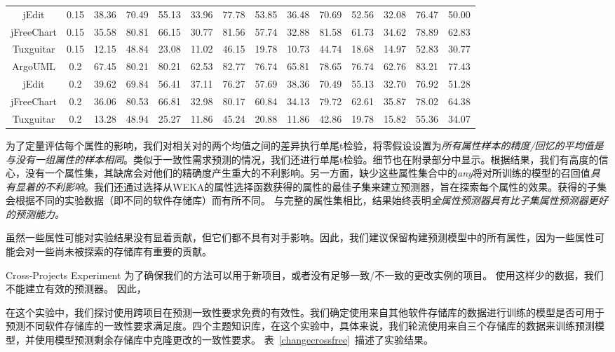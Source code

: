 {\begin{table}[htbp]
\begin{tabular}{cccccccccccccc}
jEdit&0.15&	38.36&	70.49&	55.13&	33.96&	77.78&	53.85&	36.48&	70.69&	52.56&	32.08&	76.47&	50.00\\
jFreeChart&0.15&	35.58&	80.81&	66.15&	30.77&	81.56&	57.74&	32.88&	81.58&	61.73&	34.62&	78.89&	62.83\\
Tuxguitar&0.15&	12.15&	48.84&	23.08&	11.02&	46.15&	19.78&	10.73&	44.74&	18.68&	14.97&	52.83&	30.77\\
\hline
ArgoUML&0.2&	67.45&	80.21&	80.21&	62.53&	82.77&	76.74&	65.81&	78.65&	76.74&	62.76&	83.21&	77.43\\
jEdit&0.2&	39.62&	69.84&	56.41&	37.11&	76.27&	57.69&	38.36&	70.49&	55.13&	32.70&	76.92&	51.28\\
jFreeChart&0.2&	36.06&	80.53&	66.81&	32.98&	80.17&	60.84&	34.13&	79.72&	62.61&	35.87&	78.02&	64.38\\
Tuxguitar&0.2&	13.28&	48.94&	25.27&	11.86&	45.24&	20.88&	11.86&	42.86&	19.78&	15.82&	55.36&	34.07\\
\bottomrule[1.5pt]
\end{tabular}
\end{table}

为了定量评估每个属性的影响，我们对相关对的两个均值之间的差异执行单尾t检验，将零假设设置为{\em 所有属性样本的精度/回忆的平均值是与没有一组属性的样本相同}。类似于一致性需求预测的情况，我们还进行单尾t检验。细节也在附录部分中显示。根据结果​​，我们有高度的信心，没有一个属性集，其缺席会对他们的精确度产生重大的不利影响。另一方面，缺少这些属性集合中的{\em  any}将对所训练的模型的召回值{\em 具有显着的不利影响}。我们还通过选择从WEKA的属性选择函数获得的属性的最佳子集来建立预测器，旨在探索每个属性的效果。获得的子集会根据不同的实验数据（即不同的软件存储库）而有所不同。
与完整的属性集相比，结果始终表明{\em 全属性预测器具有比子集属性预测器更好的预测能力。}

虽然一些属性可能对实验结果没有显着贡献，但它们都不具有对手影响。因此，我们建议保留构建预测模型中的所有属性，因为一些属性可能会对一些尚未被探索的存储库有重要的贡献。

{Cross-Projects Experiment}
为了确保我们的方法可以用于新项目，或者没有足够一致/不一致的更改实例的项目。 使用这样少的数据，我们不能建立有效的预测器。 因此，

在这个实验中，我们探讨使用跨项目在预测一致性要求免费的有效性。我们确定使用来自其他软件存储库的数据进行训练的模型是否可用于预测不同软件存储库的一致性要求满足度。四个主题知识库，在这个实验中，具体来说，我们轮流使用来自三个存储库的数据来训练预测模型，并使用模型预测剩余存储库中克隆更改的一致性要求。
表~\ref{changecrossfree}~描述了实验结果。

}
